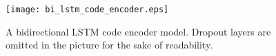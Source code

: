 \begin{figure}[!h]
	\texttt{[image: bi\_lstm\_code\_encoder.eps]}
	\centering
	\caption{A bidirectional LSTM code encoder model. Dropout layers are omitted in the picture for the sake of readability.}
	\label{bi_lstm_code_encoder}
\end{figure}





